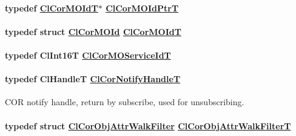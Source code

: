 \hypertarget{group__group13_ga29}{
\paragraph[ClCorMOIdPtrT]{\setlength{\rightskip}{0pt plus 5cm}typedef \hyperlink{struct_cl_cor_m_o_id}{Cl\-Cor\-MOId\-T}$\ast$ \hyperlink{struct_cl_cor_m_o_id}{Cl\-Cor\-MOId\-Ptr\-T}}\hfill}
\label{group__group13_ga29}


\hypertarget{group__group13_ga28}{
\paragraph[ClCorMOIdT]{\setlength{\rightskip}{0pt plus 5cm}typedef struct \hyperlink{struct_cl_cor_m_o_id}{Cl\-Cor\-MOId} \hyperlink{struct_cl_cor_m_o_id}{Cl\-Cor\-MOId\-T}}\hfill}
\label{group__group13_ga28}


\hypertarget{group__group13_ga27}{
\paragraph[ClCorMOServiceIdT]{\setlength{\rightskip}{0pt plus 5cm}typedef Cl\-Int16T \hyperlink{group__group13_ga27}{Cl\-Cor\-MOService\-Id\-T}}\hfill}
\label{group__group13_ga27}


\hypertarget{group__group13_ga59}{
\paragraph[ClCorNotifyHandleT]{\setlength{\rightskip}{0pt plus 5cm}typedef Cl\-Handle\-T \hyperlink{group__group13_ga59}{Cl\-Cor\-Notify\-Handle\-T}}\hfill}
\label{group__group13_ga59}


COR notify handle, return by subscribe, used for unsubscribing. \hypertarget{group__group13_ga34}{
\paragraph[ClCorObjAttrWalkFilterT]{\setlength{\rightskip}{0pt plus 5cm}typedef struct \hyperlink{struct_cl_cor_obj_attr_walk_filter}{Cl\-Cor\-Obj\-Attr\-Walk\-Filter} \hyperlink{struct_cl_cor_obj_attr_walk_filter}{Cl\-Cor\-Obj\-Attr\-Walk\-Filter\-T}}\hfill}
\label{group__group13_ga34}


